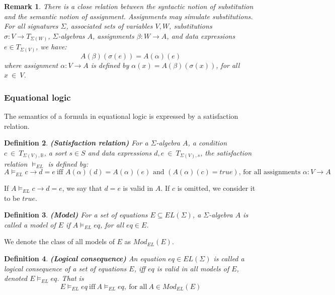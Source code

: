 \documentclass[a4paper,11pt]{article}
\newcommand{\Bools}{{\mathbb B}}   %
\newtheorem{thdefinition}{Definition}[section]
\newenvironment{definition}
  {\begin{thdefinition}\em}
  {\end{thdefinition}}
\newtheorem{thremark}[thdefinition]{Remark}
\newenvironment{remark}
  {\begin{thremark}\em}
  {\end{thremark}}
\begin{document}
\begin{remark}
There is a close relation between the syntactic notion of substitution and the semantic notion of assignment. Assignments may simulate substitutions. For all signatures $\Sigma$, associated sets of variables $V, W$, substitutions $\sigma : V \rightarrow T_{\Sigma(W)}$, $\Sigma$-algebras $A$, assignments $\beta : W \rightarrow A$, and data expressions $e \in T_{\Sigma(V)}$, we have:
\begin{equation*}
 A(\beta)(\sigma(e)) = A(\alpha)(e)
\end{equation*}
where assignment $\alpha : V \rightarrow A$ is defined by $\alpha(x) = A(\beta)(\sigma(x))$, for all $x~\in~V$.
\end{remark}

\subsubsection{Equational logic}
The semantics of a formula in equational logic is expressed by a satisfaction relation.
\begin{definition}\textbf{(Satisfaction relation)}
For a $\Sigma$-algebra $A$, a condition $c~\in~T_{\Sigma(V),\Bools}$, a sort $s \in S$ and data expressions $d, e~\in~T_{\Sigma(V),s}$, the satisfaction relation $\vDash_{EL}$ is defined by:
\begin{equation*}
 A \vDash_{EL} c \rightarrow d = e~\text{iff $A(\alpha)(d) = A(\alpha)(e)$ and $(A(\alpha)(c) = true)$, for all assignments $\alpha : V \rightarrow A$}
\end{equation*}
\end{definition}
If $A \vDash_{EL} c \rightarrow d = e$, we say that $d = e$ is valid in $A$. If $c$ is omitted, we consider it to be $true$.

\begin{definition}\textbf{(Model)}
For a set of equations $E \subseteq EL(\Sigma)$, a $\Sigma$-algebra $A$ is called a model of $E$ if $A \vDash_{EL} eq$, for all $eq \in E$.
\end{definition}
We denote the class of all models of $E$ as $Mod_{EL}(E)$.

\begin{definition}\textbf{(Logical consequence)}
An equation $eq \in EL(\Sigma)$ is called a logical consequence of a set of equations $E$, iff $eq$ is valid in all models of $E$, denoted $E \vDash_{EL} eq$. That is
\begin{equation*}
 E \vDash_{EL} eq~\text{iff}~A \vDash_{EL} eq,~\text{for all}~A \in Mod_{EL}(E)
\end{equation*}
\end{definition}
\end{document}
